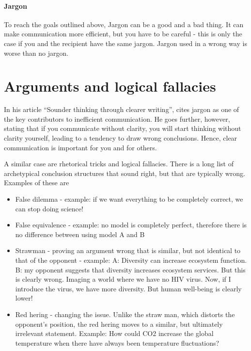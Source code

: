 \documentclass{tufte-book}
\begin{document}
\paragraph{Jargon} To reach the goals outlined above, Jargon can be a good and a bad thing. It can make communication more efficient, but you have to be careful - this is only the case if you and the recipient have the same jargon. Jargon used in a wrong way is worse than no jargon.



\section{Arguments and logical fallacies}\label{ch: arguments and logicical fallacies}

In his article ``Sounder thinking through clearer writing'', \citet{Woodford-Sounderthinkingthrough-1967} cites jargon as one of the key contributors to inefficient communication. He goes further, however, stating that if you communicate without clarity, you will start thinking without clarity yourself, leading to a tendency to draw wrong conclusions. Hence, clear communication is important for you and for others.


A similar case are rhetorical tricks and logical fallacies. There is a long list of archetypical conclusion structures that sound right, but that are typically wrong. Examples of these are

\begin{itemize}
\item False dilemma - example: if we want everything to be completely correct, we can stop doing science!
\item False equivalence - example: no model is completely perfect, therefore there is no difference between using model A and B
\item Strawman - proving an argument wrong that is similar, but not identical to that of the opponent -  example: A: Diversity can increase ecosystem function. B: my opponent suggests that diversity increases ecosystem services. But this is clearly wrong. Imaging a world where we have no HIV virus. Now, if I introduce the virus, we have more diversity. But human well-being is clearly lower!
\item Red hering - changing the issue. Unlike the straw man, which distorts the opponent's position, the red hering moves to a similar, but ultimately irrelevant statement. Example: How could CO2 increase the global temperature when there have always been temperature fluctuations?

\end{itemize}
\end{document}
